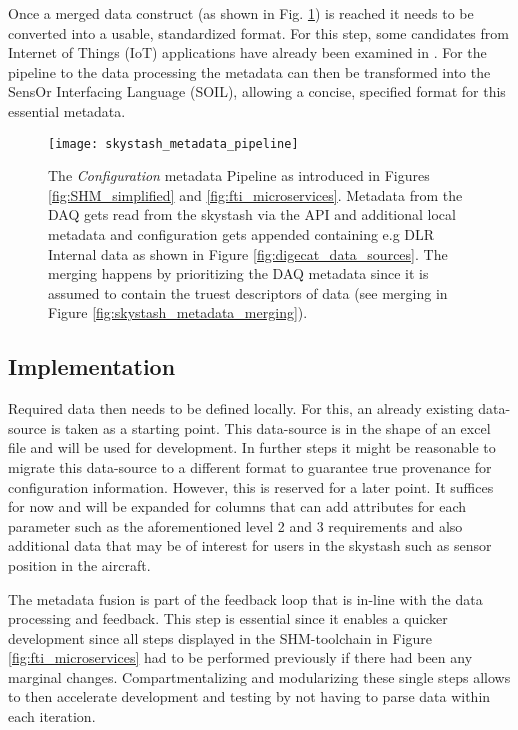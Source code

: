Once a merged data construct (as shown in Fig. \ref{fig:skystash_metadata_pipeline}) is reached it needs to be converted into a usable, standardized format. For this step, some candidates from Internet of Things (IoT) applications have already been examined in \textcite{bodenbenner_model-driven_2022}. For the pipeline to the data processing the metadata can then be transformed into the SensOr Interfacing Language (SOIL), allowing a concise, specified format for this essential metadata.

\begin{figure}
    \centering
    \texttt{[image: skystash\_metadata\_pipeline]}
    \caption[The SHM Metadata Pipeline]{The \textit{Configuration} metadata Pipeline as introduced in Figures \ref{fig:SHM_simplified} and \ref{fig:fti_microservices}. Metadata from the DAQ gets read from the skystash via the API and additional local metadata and configuration gets appended containing e.g DLR Internal data as shown in Figure \ref{fig:digecat_data_sources}. The merging happens by prioritizing the DAQ metadata since it is assumed to contain the truest descriptors of data (see merging in Figure \ref{fig:skystash_metadata_merging}). }
    \label{fig:skystash_metadata_pipeline}
\end{figure}

\subsection{Implementation}
Required data then needs to be defined locally. For this, an already existing data-source is taken as a starting point. This data-source is in the shape of an excel file and will be used for development. In further steps it might be reasonable to migrate this data-source to a different format to guarantee true provenance for configuration information. However, this is reserved for a later point. It suffices for now and will be expanded for columns that can add attributes for each parameter such as the aforementioned level 2 and 3 requirements and also additional data that may be of interest for users in the skystash such as sensor position in the aircraft.

The metadata fusion is part of the feedback loop that is in-line with the data processing and feedback. This step is essential since it enables a quicker development since all steps displayed in the SHM-toolchain in Figure \ref{fig:fti_microservices} had to be performed previously if there had been any marginal changes. Compartmentalizing and modularizing these single steps allows to then accelerate development and testing by not having to parse data within each iteration.


